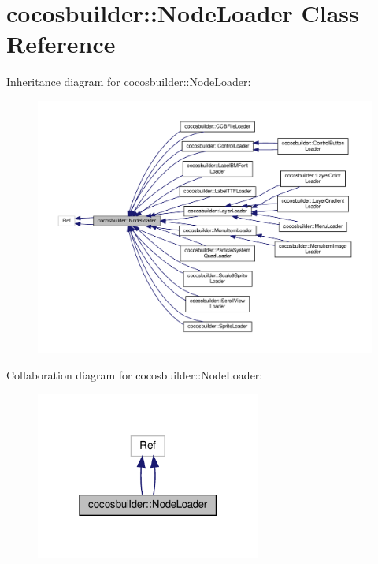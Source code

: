 \hypertarget{classcocosbuilder_1_1NodeLoader}{}\section{cocosbuilder\+:\+:Node\+Loader Class Reference}
\label{classcocosbuilder_1_1NodeLoader}


Inheritance diagram for cocosbuilder\+:\+:Node\+Loader\+:
\nopagebreak
\begin{figure}[H]
\begin{center}
\leavevmode
\includegraphics[width=350pt]{classcocosbuilder_1_1NodeLoader__inherit__graph}
\end{center}
\end{figure}


Collaboration diagram for cocosbuilder\+:\+:Node\+Loader\+:
\nopagebreak
\begin{figure}[H]
\begin{center}
\leavevmode
\includegraphics[width=210pt]{classcocosbuilder_1_1NodeLoader__coll__graph}
\end{center}
\end{figure}
